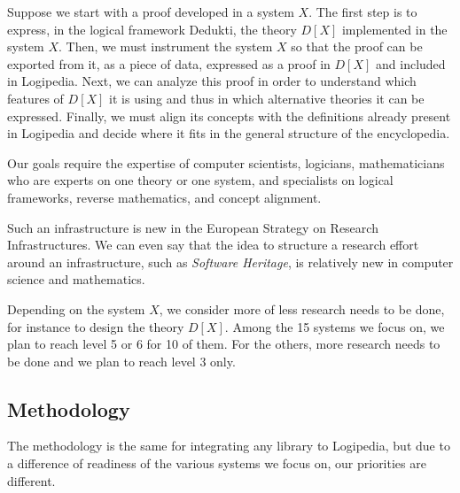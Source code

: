 Suppose we start with a proof developed in a system $X$. The first step
is to express, in the logical framework {\sc Dedukti}, the theory
$D[X]$ implemented in the system $X$. Then, we must instrument the
system $X$ so that the proof can be exported from it, as a piece of
data, expressed as a proof in $D[X]$ and included in {\sc
Logipedia}. Next, we can analyze this proof in order to understand
which features of $D[X]$ it is using and thus in which alternative
theories it can be expressed.  Finally, we must align its concepts with
the definitions already present in {\sc Logipedia} and decide where
it fits in the general structure of the encyclopedia.

Our goals require the expertise of computer scientists,
logicians, mathematicians who are experts on one
theory or one system, and specialists on logical
frameworks, reverse mathematics, and concept alignment.

Such an infrastructure is new in the European Strategy on Research
Infrastructures. We can even say that the idea to structure a research
effort around an infrastructure, such as {\em Software Heritage}, is
relatively new in computer science and mathematics.

Depending on the system $X$, we consider more of less research needs
to be done, for instance to design the theory $D[X]$. Among the 15
systems we focus on, we plan to reach level 5 or 6 for 10 of them.
For the others, more research needs to be done and we plan to reach
level 3 only.

\subsection{Methodology}

The methodology is the same for integrating any library to {\sc Logipedia},
but due to a difference of readiness of the various systems we focus on,
our priorities are different.

